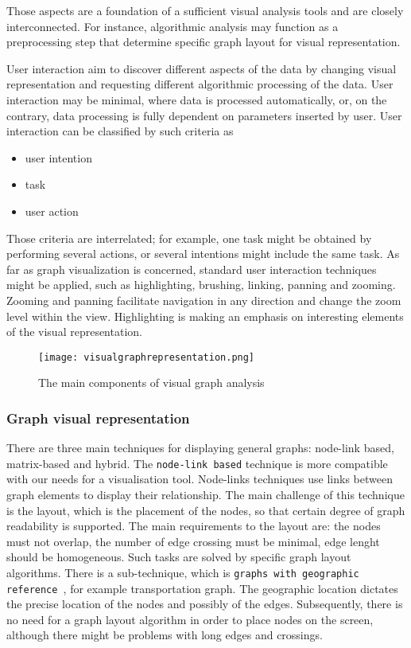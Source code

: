 \documentclass[thesis=B,english]{FITthesis}[2019/12/23]
\begin{document}
Those aspects are a foundation of a sufficient visual analysis tools and are closely interconnected. For instance, algorithmic analysis may function as a preprocessing step that determine specific graph layout for visual representation. 

User interaction aim to discover different aspects of the data by changing visual representation and requesting different algorithmic processing of the data. User interaction may be minimal, where data is processed automatically, or, on the contrary, data processing is fully dependent on parameters inserted by user. User interaction can be classified by such criteria as 
\begin{itemize}
	\item user intention
	\item task
	\item user action   
\end{itemize}

Those criteria are interrelated; for example, one task might be obtained by performing several actions, or several intentions might include the same task. As far as graph visualization is concerned, standard user interaction techniques might be applied, such as highlighting, brushing, linking, panning and zooming. Zooming and panning facilitate navigation in any direction and change the zoom level within the view. Highlighting is making an emphasis on interesting elements of the visual representation.

\begin{figure}
	\texttt{[image: visualgraphrepresentation.png]}
	\caption[The main components of visual graph analysis]{The main components of visual graph analysis}\label{fig:float3}
\end{figure}

\subsubsection{Graph visual representation}

There are three main techniques for displaying general graphs: node-link based, matrix-based and hybrid. The \verb|node-link based| technique is more compatible with our needs for a visualisation tool. Node-links techniques use links between graph elements to display their relationship. The main challenge of this technique is the layout, which is the placement of the nodes, so that certain degree of graph readability is supported. The main requirements to the layout are: the nodes must not overlap, the number of edge crossing must be minimal, edge lenght should be homogeneous. Such tasks are solved by specific graph layout algorithms. There is a sub-technique, which is \verb|graphs with geographic reference |, for example transportation graph. The geographic location dictates the precise location of the nodes and possibly of the edges. Subsequently, there is no need for a graph layout algorithm in order to place nodes on the screen, although there might be problems with long edges and crossings.\cite{bib_3}
\end{document}
